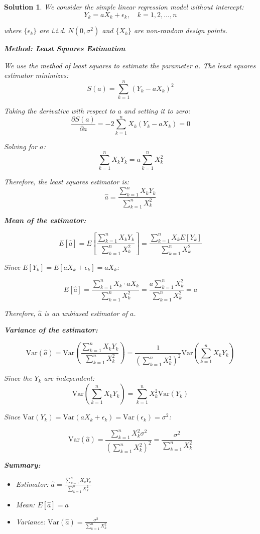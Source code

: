 \documentclass[12pt]{amsart}
\newtheorem*{solution}{Solution}
\begin{document}
\begin{solution}
We consider the simple linear regression model without intercept:
$$Y_k = aX_k + \epsilon_k, \quad k = 1,2,\ldots,n$$

where $\{\epsilon_k\}$ are i.i.d. $N(0,\sigma^2)$ and $\{X_k\}$ are non-random design points.

\textbf{Method: Least Squares Estimation}

We use the method of least squares to estimate the parameter $a$. The least squares estimator minimizes:
$$S(a) = \sum_{k=1}^n (Y_k - aX_k)^2$$

Taking the derivative with respect to $a$ and setting it to zero:
$$\frac{\partial S(a)}{\partial a} = -2\sum_{k=1}^n X_k(Y_k - aX_k) = 0$$

Solving for $a$:
$$\sum_{k=1}^n X_k Y_k = a\sum_{k=1}^n X_k^2$$

Therefore, the least squares estimator is:
$$\hat{a} = \frac{\sum_{k=1}^n X_k Y_k}{\sum_{k=1}^n X_k^2}$$

\textbf{Mean of the estimator:}

$$E[\hat{a}] = E\left[\frac{\sum_{k=1}^n X_k Y_k}{\sum_{k=1}^n X_k^2}\right] = \frac{\sum_{k=1}^n X_k E[Y_k]}{\sum_{k=1}^n X_k^2}$$

Since $E[Y_k] = E[aX_k + \epsilon_k] = aX_k$:

$$E[\hat{a}] = \frac{\sum_{k=1}^n X_k \cdot aX_k}{\sum_{k=1}^n X_k^2} = \frac{a\sum_{k=1}^n X_k^2}{\sum_{k=1}^n X_k^2} = a$$

Therefore, $\hat{a}$ is an unbiased estimator of $a$.

\textbf{Variance of the estimator:}

$$\text{Var}(\hat{a}) = \text{Var}\left(\frac{\sum_{k=1}^n X_k Y_k}{\sum_{k=1}^n X_k^2}\right) = \frac{1}{(\sum_{k=1}^n X_k^2)^2}\text{Var}\left(\sum_{k=1}^n X_k Y_k\right)$$

Since the $Y_k$ are independent:
$$\text{Var}\left(\sum_{k=1}^n X_k Y_k\right) = \sum_{k=1}^n X_k^2 \text{Var}(Y_k)$$

Since $\text{Var}(Y_k) = \text{Var}(aX_k + \epsilon_k) = \text{Var}(\epsilon_k) = \sigma^2$:

$$\text{Var}(\hat{a}) = \frac{\sum_{k=1}^n X_k^2 \sigma^2}{(\sum_{k=1}^n X_k^2)^2} = \frac{\sigma^2}{\sum_{k=1}^n X_k^2}$$

\textbf{Summary:}
\begin{itemize}
    \item Estimator: $\hat{a} = \frac{\sum_{k=1}^n X_k Y_k}{\sum_{k=1}^n X_k^2}$
    \item Mean: $E[\hat{a}] = a$
    \item Variance: $\text{Var}(\hat{a}) = \frac{\sigma^2}{\sum_{k=1}^n X_k^2}$
\end{itemize}
\end{solution}
\end{document}

